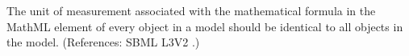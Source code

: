 The unit of measurement associated with the mathematical formula in the
MathML  element of every \KineticLaw object in a model should
be identical to all \KineticLaw objects in the model.  (References: SBML
L3V2 .)
